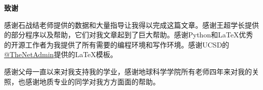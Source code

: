 \cleardoublepage{}
\begin{center}
    \bfseries {} 致谢
\end{center}

感谢石战结老师提供的数据和大量指导让我得以完成这篇文章。感谢王超学长提供的部分程序以及帮助，它们对我文章起到了巨大帮助。感谢Python和\LaTeX 优秀的开源工作者为我提供了所有需要的编程环境和写作环境。感谢UCSD的\hyperlink{https://github.com/TheNetAdmin/zjuthesis}{@TheNetAdmin}提供的\LaTeX 模板。

感谢父母一直以来对我支持我的学业，感谢地球科学学院所有老师四年来对我的关照，也感谢地质专业的同学对我方方面面的帮助。